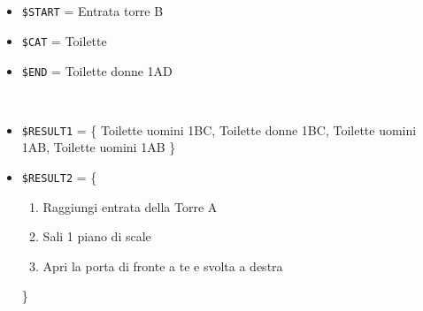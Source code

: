 \documentclass[../../Sperimentazione.tex]{subfiles}
\begin{document}
			\paragraph*{}
			\label{Prova1B.1}		
			\begin{tcolorbox}[fonttitle=\bfseries, 
								adjusted title={\Large Prova 1B.1}, 
								breakable, 
								sharp corners=south,
								colback=white, 
								colframe=white!60!black]
								
				\begin{description}[leftmargin=0.7cm,labelwidth=!]
				
					\item[Input] \ \par 
        				\begin{itemize}
        					\item \verb|$START| = Entrata torre B
        					\item \verb|$CAT| = Toilette
							\item \verb|$END| = Toilette donne 1AD
        				\end{itemize}
        				
        			\tcbline 
        				
        			\item[Output atteso] \ \par
        				\begin{itemize}
							
							\item \verb|$RESULT1| = \{
								Toilette uomini 1BC, Toilette donne 1BC, Toilette uomini 1AB, Toilette uomini 1AB
							\}         				
        				
        					\item \verb|$RESULT2| = \{
        					\begin{enumerate}
        						\item Raggiungi entrata della Torre A
								\item Sali 1 piano di scale
								\item Apri la porta di fronte a te e svolta a destra
        					\end{enumerate}
        					\}
        					       					
        					
        				\end{itemize}

					\tcbline        				
        				
        			\item[Output riscontrato] \ \par
        				\begin{description}
        				

\end{description}
\end{description}
\end{tcolorbox}
\end{document}
